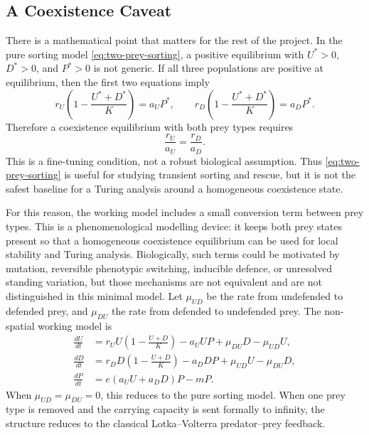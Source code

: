 \documentclass[12pt,letterpaper]{article}
\numberwithin{equation}{section}
\begin{document}
\subsection{A Coexistence Caveat}

There is a mathematical point that matters for the rest of the project. In the pure
sorting model \eqref{eq:two-prey-sorting}, a positive equilibrium with
$U^*>0$, $D^*>0$, and $P^*>0$ is not generic. If all three populations are positive at
equilibrium, then the first two equations imply
\begin{equation}
    r_U\left(1-\frac{U^*+D^*}{K}\right)=a_U P^*,
    \qquad
    r_D\left(1-\frac{U^*+D^*}{K}\right)=a_D P^*.
\end{equation}
Therefore a coexistence equilibrium with both prey types requires
\begin{equation}
    \frac{r_U}{a_U}=\frac{r_D}{a_D}.
\end{equation}
This is a fine-tuning condition, not a robust biological assumption. Thus
\eqref{eq:two-prey-sorting} is useful for studying transient sorting and rescue, but it
is not the safest baseline for a Turing analysis around a homogeneous coexistence
state.

For this reason, the working model includes a small conversion term between prey
types. This is a phenomenological modelling device: it keeps both prey states present
so that a homogeneous coexistence equilibrium can be used for local stability and
Turing analysis. Biologically, such terms could be motivated by mutation, reversible
phenotypic switching, inducible defence, or unresolved standing variation, but those
mechanisms are not equivalent and are not distinguished in this minimal model. Let
$\mu_{UD}$ be the rate from undefended to defended prey, and $\mu_{DU}$ the rate from
defended to undefended prey. The non-spatial working model is
\begin{equation}
\boxed{
\begin{aligned}
    \frac{dU}{dt}
    &= r_U U\left(1-\frac{U+D}{K}\right)-a_U U P
    +\mu_{DU}D-\mu_{UD}U,\\
    \frac{dD}{dt}
    &= r_D D\left(1-\frac{U+D}{K}\right)-a_D D P
    +\mu_{UD}U-\mu_{DU}D,\\
    \frac{dP}{dt}
    &= e(a_U U+a_D D)P-mP.
\end{aligned}}
\label{eq:two-prey-switching}
\end{equation}
When $\mu_{UD}=\mu_{DU}=0$, this reduces to the pure sorting model. When one prey type
is removed and the carrying capacity is sent formally to infinity, the structure
reduces to the classical Lotka--Volterra predator--prey feedback.
\end{document}
